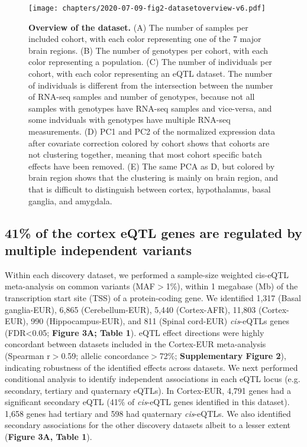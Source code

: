 \begin{figure}[H]
	\texttt{[image: chapters/2020-07-09-fig2-datasetoverview-v6.pdf]}
	\caption{\textbf{Overview of the dataset.} (A) The number of samples per included cohort, with each color representing one of the 7 major brain regions. (B) The number of genotypes per cohort, with each color representing a population. (C) The number of individuals per cohort, with each color representing an eQTL dataset. The number of individuals is different from the intersection between the number of RNA-seq samples and number of genotypes, because not all samples with genotypes have RNA-seq samples and vice-versa, and some indviduals with genotypes have multiple RNA-seq measurements. (D) PC1 and PC2 of the normalized expression data after covariate correction colored by cohort shows that cohorts are not clustering together, meaning that most cohort specific batch effects have been removed. (E) The same PCA as D, but colored by brain region shows that the clustering is mainly on brain region, and that is difficult to distinguish between cortex, hypothalamus, basal ganglia, and amygdala.}
\end{figure}

\subsection{41\% of the cortex eQTL genes are regulated by multiple independent variants}
Within each discovery dataset, we performed a sample-size weighted cis-eQTL meta-analysis on common variants (MAF$>$1\%), within 1 megabase (Mb) of the transcription start site (TSS) of a protein-coding gene. We identified 1,317 (Basal ganglia-EUR), 6,865 (Cerebellum-EUR), 5,440 (Cortex-AFR), 11,803 (Cortex-EUR), 990 (Hippocampus-EUR), and 811 (Spinal cord-EUR) \emph{cis}-eQTLs genes (FDR<0.05; \textbf{Figure 3A; Table 1}). eQTL effect directions were highly concordant between datasets included in the Cortex-EUR meta-analysis (Spearman r$>$0.59; allelic concordance$>$72\%; \textbf{Supplementary Figure 2}), indicating robustness of the identified effects across datasets. We next performed conditional analysis to identify independent associations in each eQTL locus (e.g. secondary, tertiary and quaternary eQTLs). In Cortex-EUR, 4,791 genes had a significant secondary eQTL (41\% of \emph{cis}-eQTL genes identified in this dataset). 1,658 genes had tertiary and 598 had quaternary \emph{cis}-eQTLs. We also identified secondary associations for the other discovery datasets albeit to a lesser extent (\textbf{Figure 3A, Table 1}).  

